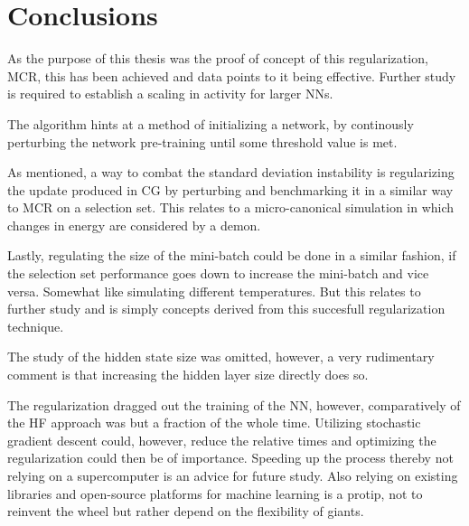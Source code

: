 \chapter{Conclusions}

As the purpose of this thesis was the proof of concept of this regularization, MCR, this has been achieved and data points to it being effective. Further study is required to establish a scaling in activity for larger NNs.

The algorithm hints at a method of initializing a network, by continously perturbing the network pre-training until some threshold value is met. 

As mentioned, a way to combat the standard deviation instability is regularizing the update produced in CG by perturbing and benchmarking it in a similar way to MCR on a selection set. This relates to a micro-canonical simulation in which changes in energy are considered by a demon. 

Lastly, regulating the size of the mini-batch could be done in a similar fashion, if the selection set performance goes down to increase the mini-batch and vice versa. Somewhat like simulating different temperatures. But this relates to further study and is simply concepts derived from this succesfull regularization technique.

The study of the hidden state size was omitted, however, a very rudimentary comment is that increasing the hidden layer size directly does so.

The regularization dragged out the training of the NN, however, comparatively of the HF approach was but a fraction of the whole time. Utilizing stochastic gradient descent could, however, reduce the relative times and optimizing the regularization could then be of importance. Speeding up the process thereby not relying on a supercomputer is an advice for future study. Also relying on existing libraries and open-source platforms for machine learning is a protip, not to reinvent the wheel but rather depend on the flexibility of giants.

